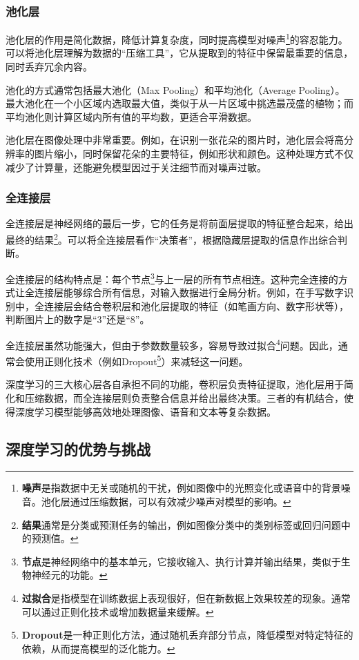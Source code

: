 \subsubsection{池化层}

池化层的作用是简化数据，降低计算复杂度，同时提高模型对噪声\footnote{\textbf{噪声}是指数据中无关或随机的干扰，例如图像中的光照变化或语音中的背景噪音。池化层通过压缩数据，可以有效减少噪声对模型的影响。}的容忍能力。可以将池化层理解为数据的“压缩工具”，它从提取到的特征中保留最重要的信息，同时丢弃冗余内容。

池化的方式通常包括最大池化（Max Pooling）和平均池化（Average Pooling）。最大池化在一个小区域内选取最大值，类似于从一片区域中挑选最茂盛的植物；而平均池化则计算区域内所有值的平均数，更适合平滑数据。

池化层在图像处理中非常重要。例如，在识别一张花朵的图片时，池化层会将高分辨率的图片缩小，同时保留花朵的主要特征，例如形状和颜色。这种处理方式不仅减少了计算量，还能避免模型因过于关注细节而对噪声过敏。

\subsubsection{全连接层}

全连接层是神经网络的最后一步，它的任务是将前面层提取的特征整合起来，给出最终的结果\footnote{\textbf{结果}通常是分类或预测任务的输出，例如图像分类中的类别标签或回归问题中的预测值。}。可以将全连接层看作“决策者”，根据隐藏层提取的信息作出综合判断。

全连接层的结构特点是：每个节点\footnote{\textbf{节点}是神经网络中的基本单元，它接收输入、执行计算并输出结果，类似于生物神经元的功能。}与上一层的所有节点相连。这种完全连接的方式让全连接层能够综合所有信息，对输入数据进行全局分析。例如，在手写数字识别中，全连接层会结合卷积层和池化层提取的特征（如笔画方向、数字形状等），判断图片上的数字是“3”还是“8”。

全连接层虽然功能强大，但由于参数数量较多，容易导致过拟合\footnote{\textbf{过拟合}是指模型在训练数据上表现很好，但在新数据上效果较差的现象。通常可以通过正则化技术或增加数据量来缓解。}问题。因此，通常会使用正则化技术（例如Dropout\footnote{\textbf{Dropout}是一种正则化方法，通过随机丢弃部分节点，降低模型对特定特征的依赖，从而提高模型的泛化能力。}）来减轻这一问题。

深度学习的三大核心层各自承担不同的功能，卷积层负责特征提取，池化层用于简化和压缩数据，而全连接层则负责整合信息并给出最终决策。三者的有机结合，使得深度学习模型能够高效地处理图像、语音和文本等复杂数据。

\subsection{深度学习的优势与挑战}

